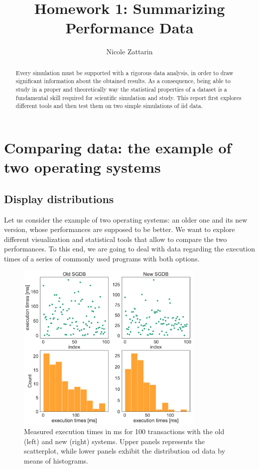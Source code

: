 \documentclass[twoside,onecolumn]{article}
\title{Homework 1: Summarizing Performance Data } %
\author{Nicole Zattarin}
\date{}
\theoremstyle{definition}
\begin{document}
\maketitle

\begin{abstract}
Every simulation must be supported with a rigorous data analysis, in order to draw significant information about the obtained results. As a consequence, being able to study in a proper and theoretically way the statistical properties of a dataset is a fundamental skill required for scientific simulation and study. This report first explores different tools and then test them on two simple simulations of iid data.
\end{abstract}



\section{Comparing data: the example of two operating systems}

\subsection{Display distributions}

Let us consider the example of two operating systems: an older one and its new version, whose performances are supposed to be better. We want to explore different visualization and statistical tools that allow to compare the two performances. To this end, we are going to deal with data regarding the execution times of a series of commonly used programs with both options.

\begin{figure}\centering
\includegraphics[width=0.8\textwidth]{../figs/extimes_distributions_vs_scatter.pdf}
\caption{Measured execution times in ms for 100 transactions with the old (left) and new (right) systems. Upper panels represents the scatterplot, while lower panels exhibit the distribution od data by means of histograms. }\label{fig:distribution_scatter}
\end{figure}
\end{document}
